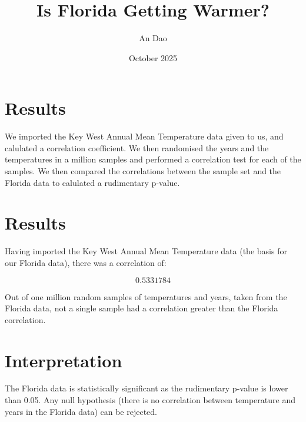 \documentclass{article}
\title{Is Florida Getting Warmer?}
\author{An Dao}
\date{October 2025}
\begin{document}
\maketitle

\section{Results}
We imported the Key West Annual Mean Temperature data given to us, and calulated a correlation coefficient. We then randomised the years and the temperatures in a million samples and performed a correlation test for each of the samples. We then compared the correlations between the sample set and the Florida data to calulated a rudimentary p-value.

\section{Results}
Having imported the Key West Annual Mean Temperature data (the basis for our Florida data), there was a correlation of:

\[ 0.5331784 \]

Out of one million random samples of temperatures and years, taken from the Florida data, not a single sample had a correlation greater than the Florida correlation.

\section{Interpretation}
The Florida data is statistically significant as the rudimentary p-value is lower than 0.05. Any null hypothesis (there is no correlation between temperature and years in the Florida data) can be rejected.
\end{document}
